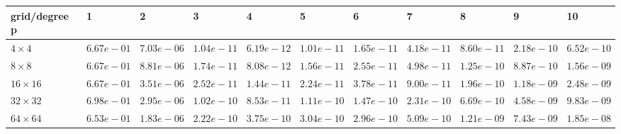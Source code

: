 \begin{tabular}{lllllllllll}
\hline
 grid/degree p   & 1          & 2          & 3          & 4          & 5          & 6          & 7          & 8          & 9          & 10         \\
\hline
 $4 \times 4$    & $6.67e-01$ & $7.03e-06$ & $1.04e-11$ & $6.19e-12$ & $1.01e-11$ & $1.65e-11$ & $4.18e-11$ & $8.60e-11$ & $2.18e-10$ & $6.52e-10$ \\
 $8 \times 8$    & $6.67e-01$ & $8.81e-06$ & $1.74e-11$ & $8.08e-12$ & $1.56e-11$ & $2.55e-11$ & $4.98e-11$ & $1.25e-10$ & $8.87e-10$ & $1.56e-09$ \\
 $16 \times 16$  & $6.67e-01$ & $3.51e-06$ & $2.52e-11$ & $1.44e-11$ & $2.24e-11$ & $3.78e-11$ & $9.00e-11$ & $1.96e-10$ & $1.18e-09$ & $2.48e-09$ \\
 $32 \times 32$  & $6.98e-01$ & $2.95e-06$ & $1.02e-10$ & $8.53e-11$ & $1.11e-10$ & $1.47e-10$ & $2.31e-10$ & $6.69e-10$ & $4.58e-09$ & $9.83e-09$ \\
 $64 \times 64$  & $6.53e-01$ & $1.83e-06$ & $2.22e-10$ & $3.75e-10$ & $3.04e-10$ & $2.96e-10$ & $5.09e-10$ & $1.21e-09$ & $7.43e-09$ & $1.85e-08$ \\
\hline
\end{tabular}